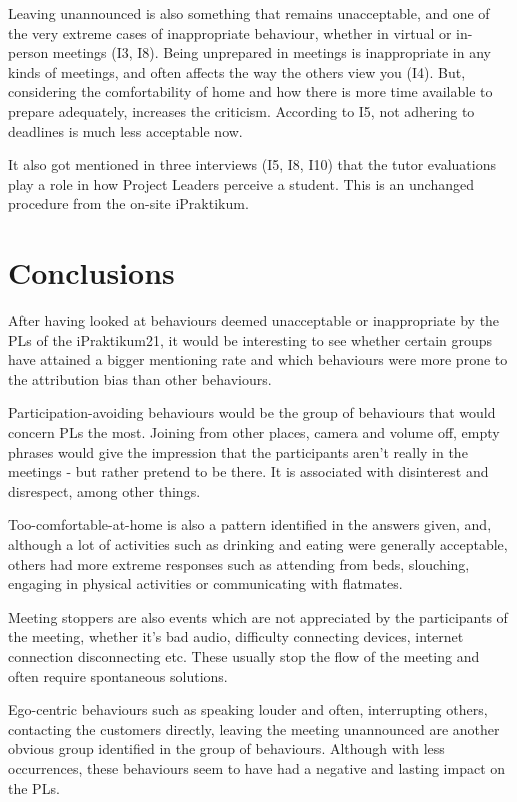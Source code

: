 Leaving unannounced is also something that remains unacceptable, and one of the very extreme cases of inappropriate behaviour, whether in virtual or in-person meetings (I3, I8).  Being unprepared in meetings is inappropriate in any kinds of meetings, and often affects the way the others view you (I4). But, considering the comfortability of home and how there is more time available to prepare adequately, increases the criticism. According to I5, not adhering to deadlines is much less acceptable now.

It also got mentioned in three interviews (I5, I8, I10) that the tutor evaluations play a role in how Project Leaders perceive a student. This is an unchanged procedure from the on-site iPraktikum. 

\section{Conclusions}\label{Analysis}

After having looked at behaviours deemed unacceptable or inappropriate by the PLs of the iPraktikum21, it would be interesting to see whether certain groups have attained a bigger mentioning rate and which behaviours were more prone to the attribution bias than other behaviours.

Participation-avoiding behaviours would be the group of behaviours that would concern PLs the most. Joining from other places, camera and volume off, empty phrases would give the impression that the participants aren't really in the meetings - but rather pretend to be there. It is associated with disinterest and disrespect, among other things. 

Too-comfortable-at-home is also a pattern identified in the answers given, and, although a lot of activities such as drinking and eating were generally acceptable, others had more extreme responses such as attending from beds, slouching, engaging in physical activities or communicating with flatmates.

Meeting stoppers are also events which are not appreciated by the participants of the meeting, whether it's bad audio, difficulty connecting devices, internet connection disconnecting etc. These usually stop the flow of the meeting and often require spontaneous solutions.

Ego-centric behaviours such as speaking louder and often, interrupting others, contacting the customers directly, leaving the meeting unannounced are another obvious group identified in the group of behaviours. Although with less occurrences, these behaviours seem to have had a negative and lasting impact on the PLs.

